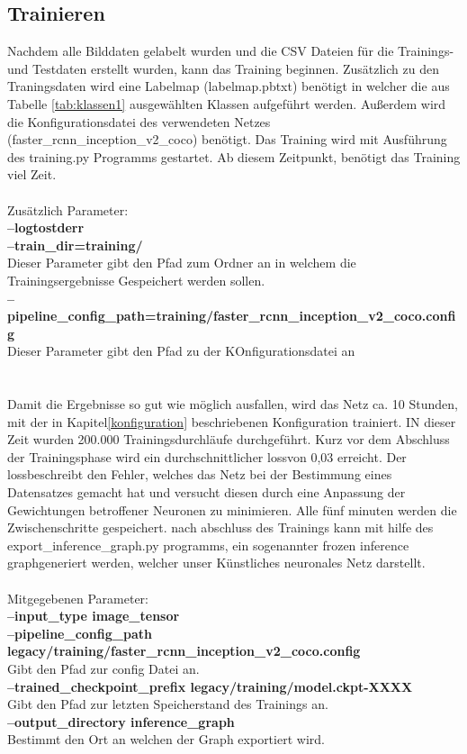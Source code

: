 \documentclass[a4paper,12pt,oneside]{article}
\begin{document}
  
  \subsection{Trainieren}
Nachdem alle Bilddaten gelabelt wurden und die CSV Dateien für die Trainings- und Testdaten erstellt wurden, kann das Training beginnen. Zusätzlich zu den Traningsdaten wird eine Labelmap (labelmap.pbtxt) benötigt in welcher die aus Tabelle \ref{tab:klassen1} ausgewählten Klassen aufgeführt werden. Außerdem wird die Konfigurationsdatei des verwendeten Netzes (faster\_rcnn\_inception\_v2\_coco) benötigt. Das Training wird mit Ausführung des training.py Programms gestartet. Ab diesem Zeitpunkt, benötigt das Training viel Zeit.\\\\
Zusätzlich Parameter: \\
\textbf{--logtostderr}\\
\textbf{--train\_dir=training/}\\
Dieser Parameter gibt den Pfad zum Ordner an in welchem die Trainingsergebnisse Gespeichert werden sollen.\\
\textbf{--pipeline\_config\_path=training/faster\_rcnn\_inception\_v2\_coco.config}\\
Dieser Parameter gibt den Pfad zu der KOnfigurationsdatei an\\\\
\\
Damit die Ergebnisse so gut wie möglich ausfallen, wird das Netz ca. 10 Stunden, mit der in Kapitel\ref{konfiguration} beschriebenen Konfiguration trainiert. IN dieser Zeit wurden 200.000 Trainingsdurchläufe    durchgeführt. Kurz vor dem Abschluss der Trainingsphase wird ein durchschnittlicher \glqq loss\grqq von 0,03 erreicht. Der \glqq loss\grqq beschreibt den Fehler, welches das Netz bei der Bestimmung eines Datensatzes gemacht hat und versucht diesen durch eine Anpassung der Gewichtungen betroffener Neuronen zu minimieren. Alle fünf minuten werden die Zwischenschritte gespeichert. nach abschluss des Trainings kann mit hilfe des export\_inference\_graph.py programms, ein sogenannter \glqq frozen inference graph\grqq  generiert werden, welcher unser Künstliches neuronales Netz darstellt.\\\\
Mitgegebenen Parameter:\\
\textbf{--input\_type image\_tensor}\\
\textbf{--pipeline\_config\_path legacy/training/faster\_rcnn\_inception\_v2\_coco.config}\\
Gibt den Pfad zur config Datei an.\\
\textbf{--trained\_checkpoint\_prefix legacy/training/model.ckpt-XXXX}\\
Gibt den Pfad zur letzten Speicherstand des Trainings an.\\
\textbf{--output\_directory inference\_graph}\\
Bestimmt den Ort an welchen der Graph exportiert wird.\\\\
\end{document}
